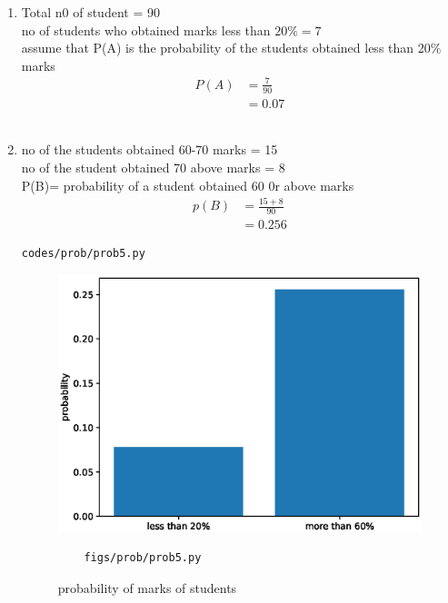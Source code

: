 \renewcommand{\theequation}{\theenumi}
\begin{enumerate}[label=\arabic*.,ref=\thesubsection.\theenumi]
\item Total n0 of student = 90
\\
no of students who obtained marks less than $20\%= 7$
\\
assume that P(A) is the probability of the students obtained less than 20$\%$ marks 
\begin{align}
	P\left(A\right) &= \frac{7}{90}
	\\
	&=0.07
\end{align}
\\
\item no of the students obtained 60-70 marks = 15
\\
no of the student obtained 70 above marks = 8
\\
P(B)= probability of a student obtained 60 0r above marks 
\begin{align}
p\left(B\right) &= \frac{15 + 8}{90}
\\
&= 0.256
\end{align}
\begin{lstlisting}
codes/prob/prob5.py
\end{lstlisting}
\begin{figure}[!ht]
	\centering
	\includegraphics[width=\columnwidth]{./figures/prob/prob5.eps}
	\caption{probability of marks of students }
	\label{fig:bt5}
	\begin{lstlisting}
	figs/prob/prob5.py
	\end{lstlisting}
\end{figure}
\end{enumerate}